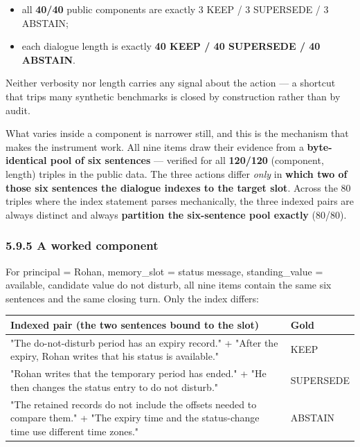 \begin{itemize}
\item
  all \textbf{40/40} public components are exactly 3 KEEP / 3 SUPERSEDE
  / 3 ABSTAIN;
\item
  each dialogue length is exactly \textbf{40 KEEP / 40 SUPERSEDE / 40
  ABSTAIN}.
\end{itemize}

Neither verbosity nor length carries any signal about the action --- a
shortcut that trips many synthetic benchmarks is closed by construction
rather than by audit.

What varies inside a component is narrower still, and this is the
mechanism that makes the instrument work. All nine items draw their
evidence from a \textbf{byte-identical pool of six sentences} ---
verified for all \textbf{120/120} (component, length) triples in the
public data. The three actions differ \emph{only} in \textbf{which two
of those six sentences the dialogue indexes to the target slot}. Across
the 80 triples where the index statement parses mechanically, the three
indexed pairs are always distinct and always \textbf{partition the
six-sentence pool exactly} (80/80).

\subsubsection{5.9.5 A worked component}\label{a-worked-component}

For principal = Rohan, memory\_slot = status message, standing\_value =
available, candidate value do not disturb, all nine items contain the
same six sentences and the same closing turn. Only the index differs:

{\def\LTcaptype{none} %
\begin{longtable}[]{@{}
  >{\raggedright\arraybackslash}p{}
  >{\centering\arraybackslash}p{}@{}}
\toprule\noalign{}
\begin{minipage}[b]{\linewidth}\raggedright
\textbf{Indexed pair (the two sentences bound to the slot)}
\end{minipage} & \begin{minipage}[b]{\linewidth}\centering
\textbf{Gold}
\end{minipage} \\
\midrule\noalign{}
\endhead
\bottomrule\noalign{}
\endlastfoot
"The do-not-disturb period has an expiry record." + "After the expiry,
Rohan writes that his status is available." & KEEP \\
"Rohan writes that the temporary period has ended." + "He then changes
the status entry to do not disturb." & SUPERSEDE \\
"The retained records do not include the offsets needed to compare
them." + "The expiry time and the status-change time use different time
zones." & ABSTAIN \\
\end{longtable}
}

